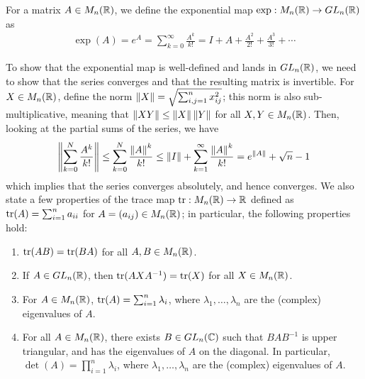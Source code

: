\begin{definition}
    For a matrix $A \in M_{n}(\mathbb{R})$, we define the exponential map $\exp:M_{n}(\mathbb{R}) \to GL_{n}(\mathbb{R})$ as
    \begin{align}
        \exp(A) = e^{A} = \sum_{k=0}^{\infty} \frac{A^{k}}{k!} = I + A + \frac{A^{2}}{2!} + \frac{A^{3}}{3!} + \cdots
    \end{align}
\end{definition}
To show that the exponential map is well-defined and lands in $GL_{n}(\mathbb{R})$, we need to show that the series converges and that the resulting matrix is invertible. For $X \in M_{n}(\mathbb{R})$, define the norm $\left\lVert X\right\rVert = \sqrt{\sum_{i,j=1}^{n} x_{ij}^{2}}$; this norm is also sub-multiplicative, meaning that $\left\lVert XY\right\rVert \leq \left\lVert X\right\rVert\left\lVert Y\right\rVert$ for all $X,Y \in M_{n}(\mathbb{R})$. Then, looking at the partial sums of the series, we have
\begin{align}
    \left\lVert\sum_{k=0}^{N} \frac{A^{k}}{k!}\right\rVert \leq \sum_{k=0}^{N} \frac{\left\lVert A\right\rVert^{k}}{k!} \leq \left\lVert I\right\rVert+\sum_{k=1}^{\infty} \frac{\left\lVert A\right\rVert^{k}}{k!} = e^{\left\lVert A\right\rVert} + \sqrt{n} - 1
\end{align}
which implies that the series converges absolutely, and hence converges. We also state a few properties of the trace map $\operatorname{tr}:M_{n}(\mathbb{R}) \to \mathbb{R}$ defined as $\operatorname{tr}(A) = \sum_{i=1}^{n} a_{ii}$ for $A = (a_{ij}) \in M_{n}(\mathbb{R})$; in particular, the following properties hold:
\begin{enumerate}
    \item $\operatorname{tr}(AB) = \operatorname{tr}(BA)$ for all $A,B \in M_{n}(\mathbb{R})$.
    \item If $A \in GL_{n}(\mathbb{R})$, then $\operatorname{tr}(AXA^{-1}) = \operatorname{tr}(X)$ for all $X \in M_{n}(\mathbb{R})$.
    \item For $A \in M_{n}(\mathbb{R})$, $\operatorname{tr}(A) = \sum_{i=1}^{n} \lambda_{i}$, where $\lambda_{1},\ldots,\lambda_{n}$ are the (complex) eigenvalues of $A$.
    \item For all $A \in M_{n}(\mathbb{R})$, there exists $B \in GL_{n}(\mathbb{C})$ such that $BAB^{-1}$ is upper triangular, and has the eigenvalues of $A$ on the diagonal. In particular, $\det(A) = \prod_{i=1}^{n} \lambda_{i}$, where $\lambda_{1},\ldots,\lambda_{n}$ are the (complex) eigenvalues of $A$.
\end{enumerate}

